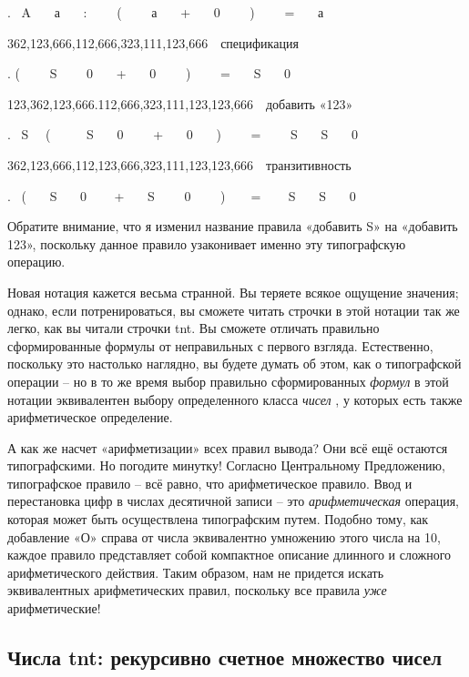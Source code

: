 \documentclass[../main.tex]{subfiles}
\begin{document}
.~ A~~~ а~~ ~:~~~~ (~~~~ а~~~ +~~~ 0~~~ ~)~~~~ =~~~ а

362,123,666,112,666,323,111,123,666~~спецификация

. (~~~~ S~~~~ 0~~~ +~~ ~0~~~~ )~~~~ =~~~ S~~~ 0

123,362,123,666.112,666,323,111,123,123,666~~добавить «123»

. ~S~~ (~~~~~ S~~~ 0~~~~ +~~ ~0~~~ )~~~~ =~~~~ S~~~ S~~~ 0

362,123,666,112,123,666,323,111,123,123,666~~транзитивность

.~ (~~~ S~~~ 0 ~~~ +~~~ S~~~~ 0~~~~ )~~~~= ~~~ S~~ ~S~~~ 0

Обратите внимание, что я изменил название правила «добавить S» на «добавить 123», поскольку данное правило узаконивает именно эту типографскую операцию.

Новая нотация кажется весьма странной. Вы теряете всякое ощущение значения; однако, если потренироваться, вы сможете читать строчки в этой нотации так же легко, как вы читали строчки \acs{tnt}\@. Вы сможете отличать правильно сформированные формулы от неправильных с первого взгляда. Естественно, поскольку это настолько наглядно, вы будете думать об этом, как о типографской операции \--- но в то же время выбор правильно сформированных \emph{формул} в этой нотации эквивалентен выбору определенного класса \emph{чисел} , у которых есть также арифметическое определение.

А как же насчет «арифметизации» всех правил вывода? Они всё ещё остаются типографскими. Но погодите минутку! Согласно Центральному Предложению, типографское правило \--- всё равно, что арифметическое правило. Ввод и перестановка цифр в числах десятичной записи \--- это \emph{арифметическая} операция, которая может быть осуществлена типографским путем. Подобно тому, как добавление «О» справа от числа эквивалентно умножению этого числа на 10, каждое правило представляет собой компактное описание длинного и сложного арифметического действия. Таким образом, нам не придется искать эквивалентных арифметических правил, поскольку все правила \emph{уже} арифметические!


\subsection{Числа \acs{tnt}: рекурсивно счетное множество чисел}
\end{document}
